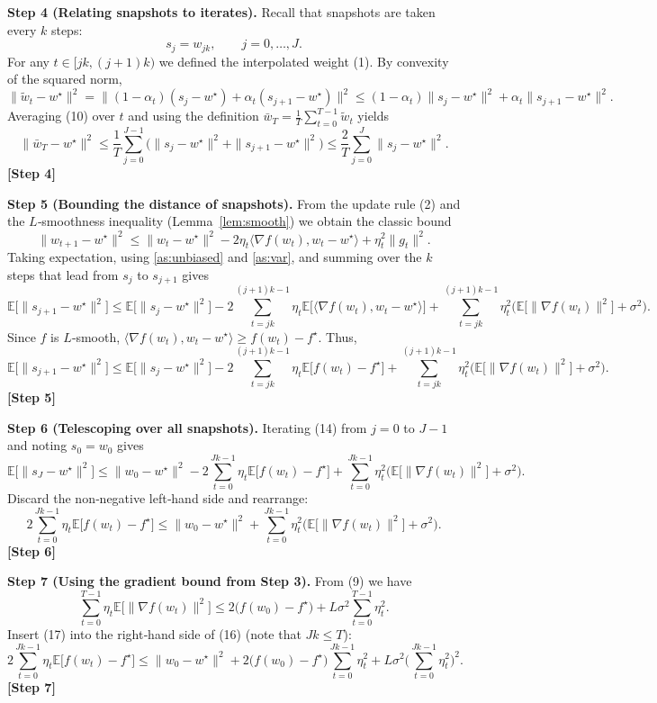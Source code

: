 \documentclass{article}
\newcommand{\E}{\mathbb{E}}
\begin{document}
\noindent\textbf{Step 4 (Relating snapshots to iterates).}  
Recall that snapshots are taken every $k$ steps:
\[
s_j = w_{jk},\qquad j=0,\dots,J.
\]
For any $t\in[jk,(j+1)k)$ we defined the interpolated weight (1). By convexity of the squared norm,
\[
\|\tilde w_t-w^\star\|^2
= \|(1-\alpha_t)(s_j-w^\star)+\alpha_t(s_{j+1}-w^\star)\|^2
\le (1-\alpha_t)\|s_j-w^\star\|^2+\alpha_t\|s_{j+1}-w^\star\|^2 .
\tag{10}
\]
Averaging (10) over $t$ and using the definition $\bar w_T=\frac1T\sum_{t=0}^{T-1}\tilde w_t$ yields
\[
\|\bar w_T-w^\star\|^2
\le \frac1T\sum_{j=0}^{J-1}\big(\|s_j-w^\star\|^2+\|s_{j+1}-w^\star\|^2\big)
\le \frac{2}{T}\sum_{j=0}^{J}\|s_j-w^\star\|^2 .
\tag{11}
\]
\textbf{[Step 4]}

\noindent\textbf{Step 5 (Bounding the distance of snapshots).}  
From the update rule (2) and the $L$‑smoothness inequality (Lemma~\ref{lem:smooth}) we obtain the classic bound
\[
\|w_{t+1}-w^\star\|^2
\le \|w_t-w^\star\|^2-2\eta_t\langle\nabla f(w_t),w_t-w^\star\rangle+\eta_t^2\|g_t\|^2 .
\tag{12}
\]
Taking expectation, using \ref{as:unbiased} and \ref{as:var}, and summing over the $k$ steps that lead from $s_j$ to $s_{j+1}$ gives
\[
\E\big[\|s_{j+1}-w^\star\|^2\big]
\le \E\big[\|s_{j}-w^\star\|^2\big]
      -2\sum_{t=jk}^{(j+1)k-1}\eta_t\E\!\big[\langle\nabla f(w_t),w_t-w^\star\rangle\big]
      +\sum_{t=jk}^{(j+1)k-1}\eta_t^2\big(\E\!\big[\|\nabla f(w_t)\|^2\big]+\sigma^2\big).
\tag{13}
\]
Since $f$ is $L$‑smooth, $\langle\nabla f(w_t),w_t-w^\star\rangle\ge f(w_t)-f^\star$.
Thus,
\[
\E\big[\|s_{j+1}-w^\star\|^2\big]
\le \E\big[\|s_{j}-w^\star\|^2\big]
      -2\sum_{t=jk}^{(j+1)k-1}\eta_t\E\!\big[f(w_t)-f^\star\big]
      +\sum_{t=jk}^{(j+1)k-1}\eta_t^2\big(\E\!\big[\|\nabla f(w_t)\|^2\big]+\sigma^2\big).
\tag{14}
\]
\textbf{[Step 5]}

\noindent\textbf{Step 6 (Telescoping over all snapshots).}  
Iterating (14) from $j=0$ to $J-1$ and noting $s_0=w_0$ gives
\[
\E\big[\|s_{J}-w^\star\|^2\big]
\le \|w_0-w^\star\|^2
      -2\sum_{t=0}^{Jk-1}\eta_t\E\!\big[f(w_t)-f^\star\big]
      +\sum_{t=0}^{Jk-1}\eta_t^2\big(\E\!\big[\|\nabla f(w_t)\|^2\big]+\sigma^2\big).
\tag{15}
\]
Discard the non‑negative left‑hand side and rearrange:
\[
2\sum_{t=0}^{Jk-1}\eta_t\E\!\big[f(w_t)-f^\star\big]
\le \|w_0-w^\star\|^2
      +\sum_{t=0}^{Jk-1}\eta_t^2\big(\E\!\big[\|\nabla f(w_t)\|^2\big]+\sigma^2\big).
\tag{16}
\]
\textbf{[Step 6]}

\noindent\textbf{Step 7 (Using the gradient bound from Step 3).}  
From (9) we have
\[
\sum_{t=0}^{T-1}\eta_t\E\!\big[\|\nabla f(w_t)\|^2\big]
\le 2\big(f(w_0)-f^\star\big)+L\sigma^2\sum_{t=0}^{T-1}\eta_t^2 .
\tag{17}
\]
Insert (17) into the right‑hand side of (16) (note that $Jk\le T$):
\[
2\sum_{t=0}^{Jk-1}\eta_t\E\!\big[f(w_t)-f^\star\big]
\le \|w_0-w^\star\|^2
     +2\big(f(w_0)-f^\star\big)\sum_{t=0}^{Jk-1}\eta_t^2
     +L\sigma^2\Big(\sum_{t=0}^{Jk-1}\eta_t^2\Big)^2 .
\tag{18}
\]
\textbf{[Step 7]}
\end{document}
